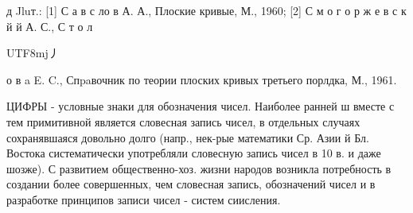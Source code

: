 \documentclass[10pt]{article}
\begin{document}
д Jluт.: [1] С а в с ло в А. А., Плоские кривые, М., 1960; [2] С м о г о р ж е в с к й й А. С., С т о л\begin{CJK}{UTF8}{mj}丿\end{CJK} о в a E. C., Спpaвочник по теории плоских кривых третьего порлдка, М., 1961.



ЦИФРЫ - условные знаки для обозначения чисел. Наиболее ранней ш вместе с тем примитивной является словесная запись чисел, в отдельных случаях сохранявшаяся довольно долго (напр., нек-рые математики Ср. Азии й Бл. Востока систематически употребляли словесную запись чисел в 10 в. и даже шозже). С развитием общественно-хоз. жизни народов возникла потребность в создании более совершенных, чем словесная запись, обозначений чисел и в разработке принципов записи чисел - систем сиисления.
\end{document}
